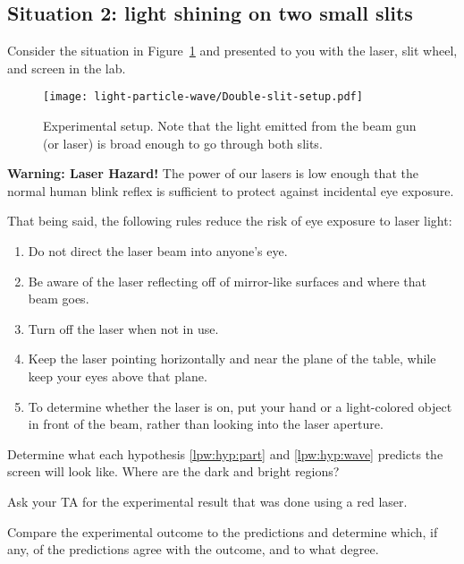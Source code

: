 \subsection{Situation 2: light shining on two small slits}

Consider the situation in Figure~\ref{lpw:fig:2slit-setup} and presented to you with the laser, slit wheel, and screen in the lab.

\begin{figure}
	\centering
	\texttt{[image: light-particle-wave/Double-slit-setup.pdf]}
	\caption{Experimental setup. Note that the light emitted from the beam gun (or laser) is broad enough to go through both slits.}\label{lpw:fig:2slit-setup}
\end{figure}

\begin{framed}
	\textbf{Warning: Laser Hazard!} The power of our lasers is low enough that the normal human blink reflex is sufficient to protect against incidental eye exposure.
	
	That being said, the following rules reduce the risk of eye exposure to laser light:
	\begin{enumerate}
		\item Do not direct the laser beam into anyone's eye.
		\item Be aware of the laser reflecting off of mirror-like surfaces and where that beam goes.
		\item Turn off the laser when not in use.
		\item Keep the laser pointing horizontally and near the plane of the table, while keep your eyes above that plane.
		\item To determine whether the laser is on, put your hand or a light-colored object in front of the beam, rather than looking into the laser aperture.
	\end{enumerate}
\end{framed}

\begin{steps}
	\item Determine what each hypothesis \ref{lpw:hyp:part} and \ref{lpw:hyp:wave} predicts the screen will look like. Where are the dark and bright regions?
	
	\item Ask your TA for the experimental result that was done using a red laser.
	
	\item Compare the experimental outcome to the predictions and determine which, if any, of the predictions agree with the outcome, and to what degree.
\end{steps}



